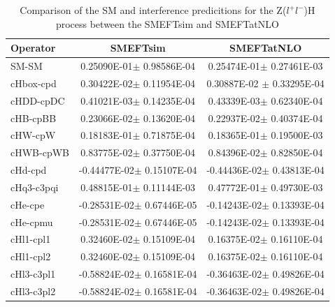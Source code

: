 \begin{table}[h]
\begin{tabular}{|l|c|c|}
\hline
\textbf{Operator} & \textbf{SMEFTsim} & \textbf{SMEFTatNLO} \\
 \hline
 SM-SM & 0.25090E-01$\pm$ 0.98586E-04& 0.25474E-01$\pm$ 0.27461E-03\\
  \hline
cHbox-cpd & 0.30422E-02$\pm$ 0.11954E-04& 0.30887E-02 $\pm$ 0.33295E-04\\
 \hline
cHDD-cpDC & 0.41021E-03$\pm$ 0.14235E-04& 0.43339E-03$\pm$ 0.62340E-04\\
\hline
cHB-cpBB & 0.23066E-02$\pm$ 0.13620E-04& 0.22937E-02$\pm$ 0.40374E-04\\
 \hline
cHW-cpW & 0.18183E-01$\pm$ 0.71875E-04& 0.18365E-01$\pm$ 0.19500E-03\\
 \hline
cHWB-cpWB & 0.83775E-02$\pm$ 0.37750E-04& 0.84396E-02$\pm$ 0.82850E-04\\
 \hline
cHd-cpd &-0.44477E-02$\pm$ 0.15107E-04&-0.44436E-02$\pm$ 0.43813E-04\\
 \hline
cHq3-c3pqi & 0.48815E-01$\pm$ 0.11144E-03& 0.47772E-01$\pm$ 0.49730E-03\\
\hline
cHe-cpe &-0.28531E-02$\pm$ 0.67446E-05& -0.14243E-02$\pm$ 0.13393E-04\\
cHe-cpmu & -0.28531E-02$\pm$ 0.67446E-05& -0.14243E-02$\pm$ 0.13393E-04\\
 \hline
cHl1-cpl1 & 0.32460E-02$\pm$ 0.15109E-04& 0.16375E-02$\pm$ 0.16110E-04\\
cHl1-cpl2 & 0.32460E-02$\pm$ 0.15109E-04& 0.16375E-02$\pm$ 0.16110E-04\\
\hline
cHl3-c3pl1 & -0.58824E-02$\pm$ 0.16581E-04& -0.36463E-02$\pm$ 0.49826E-04\\
cHl3-c3pl2 & -0.58824E-02$\pm$ 0.16581E-04& -0.36463E-02$\pm$ 0.49826E-04\\
\hline
\end{tabular}
\caption{ Comparison of the SM and interference predicitions for the Z($l^{+}l^{-}$)H process between the SMEFTsim and SMEFTatNLO}

\end{table}


